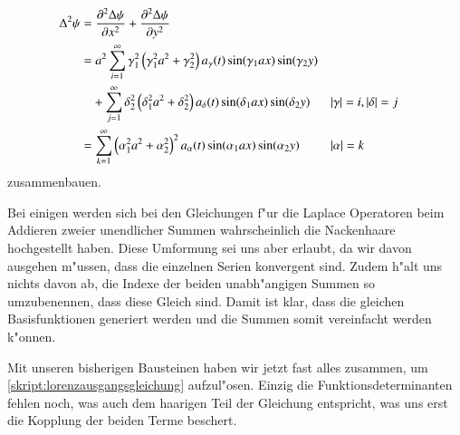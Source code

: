\begin{refsection}
\begin{align*}
\laplace^2\psi
&= 
\frac{\partial^2\laplace\psi}{\partial x^2} + 
\frac{\partial^2\laplace\psi}{\partial y^2} \\
&=
a^2
\sum_{i = 1}^{\infty}
\gamma_1^2
\left(\gamma_1^2 a^2+\gamma_2^2\right)
a_{\gamma}(t)
\sin(\gamma_1 ax) \sin(\gamma_2 y)
\\
&\phantom{={}}
+
\sum_{j = 1}^{\infty}
\delta_2^2
\left(\delta_1^2 a^2+\delta_2^2\right)
a_{\delta}(t)
\sin(\delta_1 ax) \sin(\delta_2 y)
&&|\gamma| = i, |\delta| = j
\\
&=
\sum_{k = 1}^{\infty}
\left(\alpha_1^2 a^2+\alpha_2^2\right)^2
a_{\alpha}(t)
\sin(\alpha_1 ax) \sin(\alpha_2 y)
&&|\alpha| = k
\end{align*}
zusammenbauen.

Bei einigen werden sich bei den Gleichungen f"ur die Laplace Operatoren beim 
Addieren zweier unendlicher Summen wahrscheinlich die Nackenhaare hochgestellt 
haben. Diese Umformung sei uns aber erlaubt, da wir davon ausgehen m"ussen, 
dass die einzelnen Serien konvergent sind. Zudem h"alt uns nichts davon ab, die 
Indexe der beiden unabh"angigen Summen so umzubenennen, dass diese Gleich sind. 
Damit ist klar, dass die gleichen Basisfunktionen generiert werden und die 
Summen somit vereinfacht werden k"onnen.

Mit unseren bisherigen Bausteinen haben wir jetzt fast alles zusammen, um 
\cref{skript:lorenzausgangsgleichung} aufzul"osen. Einzig die 
Funktionsdeterminanten fehlen noch, was auch dem haarigen Teil der Gleichung 
entspricht, was uns erst die Kopplung der beiden Terme beschert.


\end{refsection}
